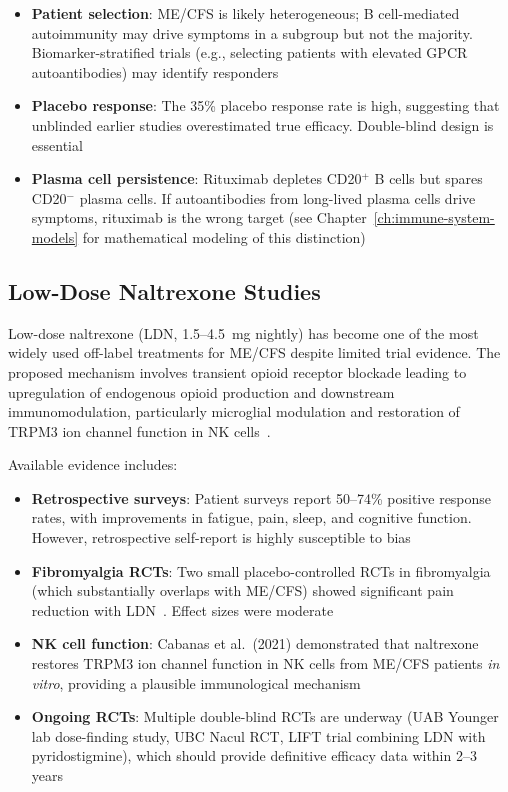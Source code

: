 \begin{itemize}
    \item \textbf{Patient selection}: ME/CFS is likely heterogeneous; B cell-mediated autoimmunity may drive symptoms in a subgroup but not the majority. Biomarker-stratified trials (e.g., selecting patients with elevated GPCR autoantibodies) may identify responders
    \item \textbf{Placebo response}: The 35\% placebo response rate is high, suggesting that unblinded earlier studies overestimated true efficacy. Double-blind design is essential
    \item \textbf{Plasma cell persistence}: Rituximab depletes CD20$^+$ B cells but spares CD20$^-$ plasma cells. If autoantibodies from long-lived plasma cells drive symptoms, rituximab is the wrong target (see Chapter~\ref{ch:immune-system-models} for mathematical modeling of this distinction)
\end{itemize}

\subsection{Low-Dose Naltrexone Studies}

Low-dose naltrexone (LDN, 1.5--4.5~mg nightly) has become one of the most widely used off-label treatments for ME/CFS despite limited trial evidence. The proposed mechanism involves transient opioid receptor blockade leading to upregulation of endogenous opioid production and downstream immunomodulation, particularly microglial modulation and restoration of TRPM3 ion channel function in NK cells~\cite{Polo2019LDN, Cabanas2021}.

Available evidence includes:

\begin{itemize}
    \item \textbf{Retrospective surveys}: Patient surveys report 50--74\% positive response rates, with improvements in fatigue, pain, sleep, and cognitive function. However, retrospective self-report is highly susceptible to bias
    \item \textbf{Fibromyalgia RCTs}: Two small placebo-controlled RCTs in fibromyalgia (which substantially overlaps with ME/CFS) showed significant pain reduction with LDN~\cite{Younger2013}. Effect sizes were moderate
    \item \textbf{NK cell function}: Cabanas et al.\ (2021) demonstrated that naltrexone restores TRPM3 ion channel function in NK cells from ME/CFS patients \textit{in vitro}, providing a plausible immunological mechanism~\cite{Cabanas2021}
    \item \textbf{Ongoing RCTs}: Multiple double-blind RCTs are underway (UAB Younger lab dose-finding study, UBC Nacul RCT, LIFT trial combining LDN with pyridostigmine), which should provide definitive efficacy data within 2--3 years
\end{itemize}

